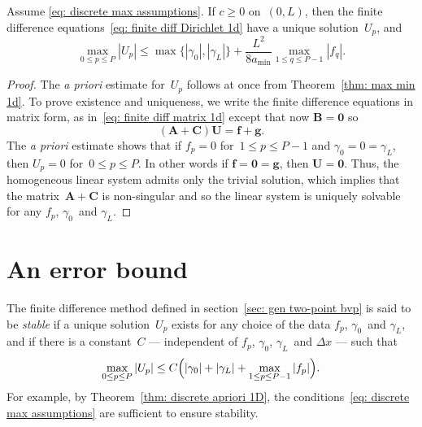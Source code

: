 \begin{theorem}\label{thm: discrete apriori 1D}
Assume \eqref{eq: discrete max assumptions}. If $c\ge0$ on~$(0,L)$, then the
finite difference equations~\eqref{eq: finite diff Dirichlet 1d} have a unique
solution~$U_p$, and
\[
\max_{0\le p\le P}|U_p|\le\max\{|\gamma_0|,|\gamma_L|\}
    +\frac{L^2}{8a_{\min}}\max_{1\le q\le P-1}|f_q|.
\]
\end{theorem}
\begin{proof}
The \emph{a priori} estimate for~$U_p$ follows at once from 
Theorem~\ref{thm: max min 1d}.  To prove existence and uniqueness, we write the 
finite difference equations in matrix form, as 
in~\eqref{eq: finite diff matrix 1d} except that 
now $\boldsymbol{B}=\boldsymbol{0}$ so
\[
(\boldsymbol{A}+\boldsymbol{C})\boldsymbol{U}=\boldsymbol{f}+\boldsymbol{g}.
\]
The \emph{a priori} estimate shows that if $f_p=0$ for~$1\le p\le P-1$ and 
$\gamma_0=0=\gamma_L$, then $U_p=0$ for~$0\le p\le P$.  In other words if 
$\boldsymbol{f}=\boldsymbol{0}=\boldsymbol{g}$, then 
$\boldsymbol{U}=\boldsymbol{0}$.  Thus, the homogeneous linear system admits 
only the trivial solution, which implies that the 
matrix~$\boldsymbol{A}+\boldsymbol{C}$ is non-singular and so the linear system 
is uniquely solvable for any $f_p$, $\gamma_0$~and $\gamma_L$.
\end{proof}

\section{An error bound}

The finite difference method defined in section~\ref{sec: gen two-point bvp}
is said to be \emph{stable} if a unique solution~$U_p$ exists for any choice of 
the data $f_p$, $\gamma_0$~and $\gamma_L$, and if there is a constant~$C$ --- 
independent of $f_p$, $\gamma_0$, $\gamma_L$~and $\Delta x$ --- such that
\[
\max_{0\le p\le P}|U_p|\le C\Bigl(|\gamma_0|+|\gamma_L|
    +\max_{1\le p\le P-1} |f_p|\Bigr).
\]
For example, by Theorem~\ref{thm: discrete apriori 1D}, the 
conditions~\eqref{eq: discrete max assumptions} are sufficient to ensure 
stability.


